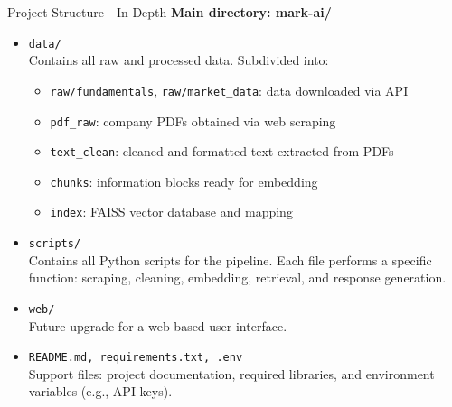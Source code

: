 \documentclass[aspectratio=169,xcolor=dvipsnames]{beamer}
\begin{document}
\begin{frame}{Project Structure - In Depth}
  \textbf{Main directory: mark-ai/}
  
  \vspace{0.2cm}
  \begin{itemize}
      \item \texttt{data/} \\
      Contains all raw and processed data. Subdivided into:
      \begin{itemize}
          \item \texttt{raw/fundamentals}, \texttt{raw/market\_data}: data downloaded via API
          \item \texttt{pdf\_raw}: company PDFs obtained via web scraping
          \item \texttt{text\_clean}: cleaned and formatted text extracted from PDFs
          \item \texttt{chunks}: information blocks ready for embedding
          \item \texttt{index}: FAISS vector database and mapping
      \end{itemize}
  
      \item \texttt{scripts/} \\
      Contains all Python scripts for the pipeline. Each file performs a specific function: scraping, cleaning, embedding, retrieval, and response generation.
  
      \item \texttt{web/} \\
      Future upgrade for a web-based user interface.
  
      \item \texttt{README.md, requirements.txt, .env} \\
      Support files: project documentation, required libraries, and environment variables (e.g., API keys).
  \end{itemize}
\end{frame}
  
\end{document}
